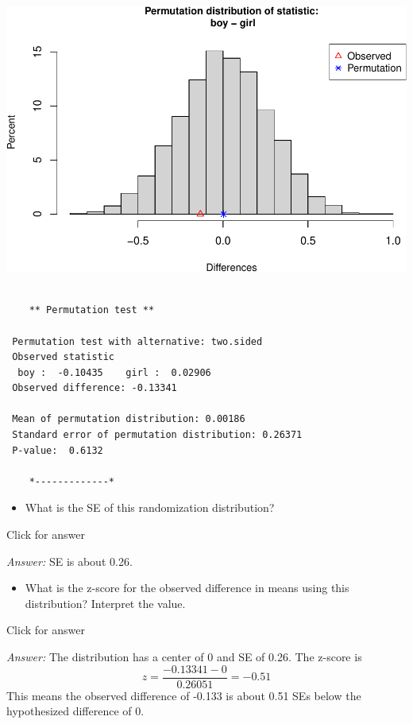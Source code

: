 \documentclass[
]{book}
\providecommand{\tightlist}{%
  \setlength{\itemsep}{0pt}\setlength{\parskip}{0pt}}
\begin{document}
\includegraphics[width=1\linewidth]{Class_Activity_14_files/figure-latex/unnamed-chunk-2-2}

\begin{verbatim}

    ** Permutation test **

 Permutation test with alternative: two.sided 
 Observed statistic
  boy :  -0.10435    girl :  0.02906 
 Observed difference: -0.13341 

 Mean of permutation distribution: 0.00186 
 Standard error of permutation distribution: 0.26371 
 P-value:  0.6132 

    *-------------*
\end{verbatim}

\begin{itemize}
\tightlist
\item
  What is the SE of this randomization distribution?
\end{itemize}

Click for answer

\emph{Answer:} SE is about 0.26.

\begin{itemize}
\tightlist
\item
  What is the z-score for the observed difference in means using this distribution? Interpret the value.
\end{itemize}

Click for answer

\emph{Answer:} The distribution has a center of 0 and SE of 0.26. The z-score is
\[
z = \dfrac{-0.13341 - 0}{0.26051} = -0.51
\]
This means the observed difference of -0.133 is about 0.51 SEs below the hypothesized difference of 0.
\end{document}
